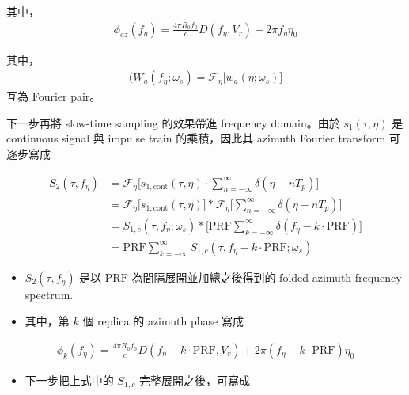 \documentclass[11pt]{article}
\providecommand{\tightlist}{%
  \setlength{\itemsep}{0pt}\setlength{\parskip}{0pt}}
\begin{document}
其中，
\begin{equation}
\begin{aligned}
\phi_{az}(f_\eta) = \frac{4\pi R_0f_0}{c}D(f_\eta,V_r)+2\pi f_\eta\eta_0
\end{aligned}
\end{equation}

其中，
\begin{equation}
\begin{aligned}(W_a(f_\eta;\omega_s) = \mathcal{F}_{\eta}\biggl[ w_a(\eta;\omega_s) \biggr]
\end{aligned}
\end{equation}
互為 Fourier pair。

下一步再將 slow-time sampling 的效果帶進 frequency domain。由於
\(s_1(\tau,\eta)\) 是 continuous signal 與 impulse train
的乘積，因此其 azimuth Fourier transform 可逐步寫成


\begin{equation}
\begin{aligned}
S_{2}(\tau,f_\eta)
&= \mathcal{F}_{\eta}\biggl[ s_{1,\mathrm{cont}}(\tau,\eta)\cdot \sum_{n=-\infty}^{\infty}\delta(\eta-nT_p) \biggr] \\
&= \mathcal{F}_{\eta}\biggl[ s_{1,\mathrm{cont}}(\tau,\eta) \biggr]\ast \mathcal{F}_{\eta}\biggl[ \sum_{n=-\infty}^{\infty}\delta(\eta-nT_p) \biggr] \\
&= S_{1,c}(\tau,f_\eta;\omega_s)\ast \biggl[ \mathrm{PRF}\sum_{k=-\infty}^{\infty}\delta(f_\eta-k\cdot\mathrm{PRF}) \biggr] \\
&= \mathrm{PRF}\sum_{k=-\infty}^{\infty} S_{1,c}(\tau,f_\eta-k\cdot\mathrm{PRF};\omega_s)
\end{aligned}
\end{equation}

\begin{itemize}
\item
  \(S_{2}(\tau,f_\eta)\) 是以 \(\mathrm{PRF}\)
  為間隔展開並加總之後得到的 folded azimuth-frequency spectrum.
\item
  其中，第 \(k\) 個 replica 的 azimuth phase 寫成
\end{itemize}

\begin{equation}
\begin{aligned} \phi_k(f_\eta) = \frac{4\pi R_0f_0}{c}D(f_\eta-k\cdot\mathrm{PRF},V_r) + 2\pi(f_\eta-k\cdot\mathrm{PRF})\eta_0 \end{aligned}
\end{equation}

\begin{itemize}
\tightlist
\item
  下一步把上式中的 \(S_{1,c}\) 完整展開之後，可寫成
\end{itemize}
\end{document}

